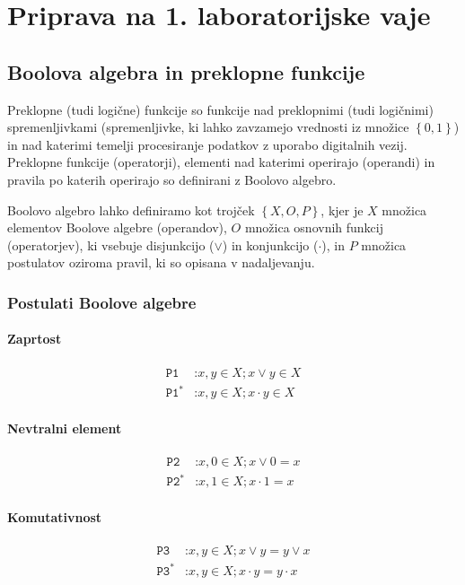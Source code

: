\chapter{Priprava na 1. laboratorijske vaje}

\section{Boolova algebra in preklopne funkcije}

Preklopne (tudi logične) funkcije so funkcije nad preklopnimi (tudi logičnimi) spremenljivkami (spremenljivke, ki lahko zavzamejo vrednosti iz množice $\left\{0, 1\right\}$) in nad katerimi temelji procesiranje podatkov z uporabo digitalnih vezij. Preklopne funkcije (operatorji), elementi nad katerimi operirajo (operandi) in pravila po katerih operirajo so definirani z Boolovo algebro.

Boolovo algebro lahko definiramo kot trojček $\left\{X, O, P\right\}$, kjer je $X$ množica elementov Boolove algebre (operandov), $O$ množica osnovnih funkcij (operatorjev), ki vsebuje disjunkcijo ($\vee$) in konjunkcijo ($\cdot$), in $P$ množica postulatov oziroma pravil, ki so opisana v nadaljevanju.

\subsection{Postulati Boolove algebre}
\subsubsection*{Zaprtost}
\begin{align*}
\texttt{P1}&\texttt{:}x,y \in X; x \vee y \in X\\
\texttt{P1}^*&\texttt{:}x,y \in X; x \cdot y \in X
\end{align*}

\subsubsection*{Nevtralni element}
\begin{align*}
\texttt{P2}&\texttt{:}x,0 \in X; x \vee 0 = x\\
\texttt{P2}^*&\texttt{:}x,1 \in X; x \cdot 1 = x
\end{align*}

\subsubsection*{Komutativnost}
\begin{align*}
\texttt{P3}&\texttt{:}x,y \in X; x \vee y = y \vee x\\
\texttt{P3}^*&\texttt{:}x,y \in X; x \cdot y = y \cdot x
\end{align*}


